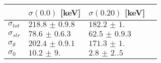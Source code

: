 \begin{tabular}{llll} \hline
\toprule 
 & $\sigma(0.0)$ [keV]  &  $\sigma(0.20)$ [keV]  \\ \midrule 
$\sigma_{tot}$ & $\num{218.8(0.98)}$ & $\num{182.2(1.0)}$\\ 
$\sigma_{str}$ & $\num{78.6(0.63)}$ & $\num{62.5(0.93)}$\\ 
$\sigma_{\theta}$ & $\num{202.4(0.91)}$ & $\num{171.3(1.0)}$\\ 
$\sigma_{0}$ & $\num{10.2(9.0)}$ & $\num{2.8(2.5)}$\\ 
 \bottomrule 
\end{tabular}
